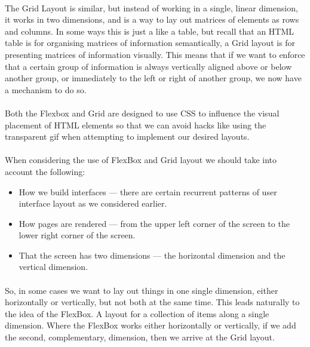 \paragraph{} The Grid Layout is similar, but instead of working in a single, linear dimension, it works in two dimensions, and is a way to lay out matrices of elements as rows and columns. In some ways this is just a like a table, but recall that an HTML table is for organising matrices of information semantically, a Grid layout is for presenting matrices of information visually. This means that if we want to enforce that a certain group of information is always vertically aligned above or below another group, or immediately to the left or right of another group, we now have a mechanism to do so.
\paragraph{} Both the Flexbox and Grid are designed to use CSS to influence the visual placement of HTML elements so that we can avoid hacks like using the transparent gif when attempting to implement our desired layouts.
\paragraph{} When considering the use of FlexBox and Grid layout we should take into account the following:

\begin{itemize}
\item How we build interfaces — there are certain recurrent patterns of user interface layout as we considered earlier.
\item How pages are rendered — from the upper left corner of the screen to the lower right corner of the screen.
\item That the screen has two dimensions — the horizontal dimension and the vertical dimension.
\end{itemize}

\paragraph{} So, in some cases we want to lay out things in one single dimension, either horizontally or vertically, but not both at the same time. This leads naturally to the idea of the FlexBox. A layout for a collection of items along a single dimension. Where the FlexBox works either horizontally or vertically, if we add the second, complementary, dimension, then we arrive at the Grid layout.
